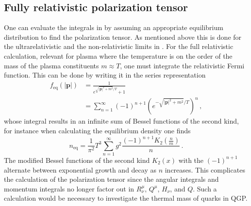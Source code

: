 \subsection{Fully relativistic polarization tensor}
One can evaluate the integrals in  by assuming an appropriate equilibrium distribution to find the polarization tensor. As mentioned above this is done for the ultrarelativistic and the non-relativistic limits in \cite{Formanek:2021blc}. For the full relativistic calculation, relevant for plasma where the temperature is on the order of the mass of the plasma constituents $m\approx T$, one must integrate the relativistic Fermi function. This can be done by writing it in the series representation \cite{Letessier:2002ony}
\begin{equation}
\begin{split}
     f_\mathrm{eq}(|\pmb{p}|) &= \frac{1}{e^{\sqrt{|\boldsymbol{p}|^2+ m^2}/T} + 1} \\
     &= \sum_{n=1}^{\infty} (-1)^{n+1}\left( e^{-\sqrt{|\boldsymbol{p}|^2+ m^2}/T}\right)^n\,,
    \end{split}
\end{equation}
whose integral results in an infinite sum of Bessel functions of the second kind, for instance when calculating the equilibrium density one finds
\begin{equation}
    n_\mathrm{eq}=\frac{1}{\pi^2}T^3\sum_{n=1}^{\infty}g^2\frac{ (-1)^{n+1} K_2\left(\frac{n}{m}\right)}{ n}\,.
\end{equation}
The modified Bessel functions of the second kind $K_2(x)$ with the $(-1)^{n+1}$ alternate between exponential growth and decay as $n$ increases. This complicates the calculation of the polarization tensor since the angular integrals and momentum integrals no longer factor out in $R^\mu_\nu$, $Q^\mu$, $H_\nu$, and $Q$. Such a calculation would be necessary to investigate the thermal mass of quarks in QGP.

